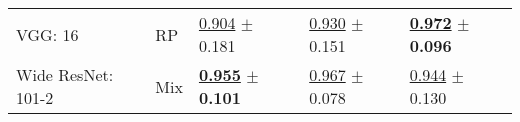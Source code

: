 \begin{tabular}{lllll}
VGG: 16 & RP & \underline{\textcolor[rgb]{0.4156250000,0.5000000000,0}{0.904}} $\pm$ \textcolor[rgb]{0.8594248459,0.1405751541,0}{0.181} & \underline{\textcolor[rgb]{0.6730769231,0.3269230769,0}{0.930}} $\pm$ \textcolor[rgb]{1.0000000000,0.0000000000,0}{0.151} & \underline{\textbf{\textcolor[rgb]{0.0000000000,0.5000000000,0}{0.972}}} $\pm$ \textbf{\textcolor[rgb]{0.0000000000,0.5000000000,0}{0.096}} \\
Wide ResNet: 101-2 & Mix & \underline{\textbf{\textcolor[rgb]{0.0000000000,0.5000000000,0}{0.955}}} $\pm$ \textbf{\textcolor[rgb]{0.0000000000,0.5000000000,0}{0.101}} & \underline{\textcolor[rgb]{0.0769230769,0.5000000000,0}{0.967}} $\pm$ \textcolor[rgb]{0.1202863916,0.5000000000,0}{0.078} & \underline{\textcolor[rgb]{0.5714285714,0.4285714286,0}{0.944}} $\pm$ \textcolor[rgb]{0.7710011231,0.2289988769,0}{0.130} \\
\bottomrule
\end{tabular}

